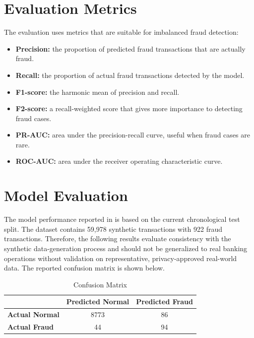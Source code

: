\documentclass[12pt,a4paper]{report}
\begin{document}
\section{Evaluation Metrics}
The evaluation uses metrics that are suitable for imbalanced fraud detection:
\begin{itemize}
    \item \textbf{Precision:} the proportion of predicted fraud transactions that are actually fraud.
    \item \textbf{Recall:} the proportion of actual fraud transactions detected by the model.
    \item \textbf{F1-score:} the harmonic mean of precision and recall.
    \item \textbf{F2-score:} a recall-weighted score that gives more importance to detecting fraud cases.
    \item \textbf{PR-AUC:} area under the precision-recall curve, useful when fraud cases are rare.
    \item \textbf{ROC-AUC:} area under the receiver operating characteristic curve.
\end{itemize}

\section{Model Evaluation}
The model performance reported in  is based on the current chronological test split. The dataset contains 59,978 synthetic transactions with 922 fraud transactions. Therefore, the following results evaluate consistency with the synthetic data-generation process and should not be generalized to real banking operations without validation on representative, privacy-approved real-world data. The reported confusion matrix is shown below.

\begin{table}[H]
\centering
\caption{Confusion Matrix}
\begin{tabular}{|l|c|c|}
\hline
 & \textbf{Predicted Normal} & \textbf{Predicted Fraud} \\ \hline
\textbf{Actual Normal} & 8773 & 86 \\ \hline
\textbf{Actual Fraud} & 44 & 94 \\ \hline
\end{tabular}
\end{table}
\end{document}
